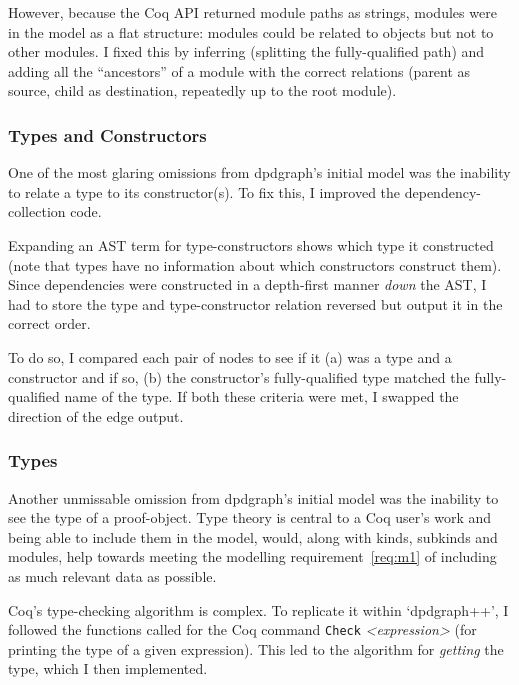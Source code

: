 However, because the Coq API returned module paths as strings, modules were in
the model as a flat structure: modules could be related to objects but not to
other modules. I fixed this by inferring (splitting the fully-qualified path)
and adding all the ``ancestors'' of a module with the correct relations
(parent as source, child as destination, repeatedly up to the root module).

\subsubsection{Types and Constructors}\label{subsubsec:typecon}

One of the most glaring omissions from dpdgraph's initial model was the
inability to relate a type to its constructor(s). To fix this,
I improved the dependency-collection code.

Expanding an AST term for type-constructors shows which type it constructed
(note that types have no information about which constructors construct them).
Since dependencies were constructed in a depth-first manner \emph{down} the AST,
I had to store the type and type-constructor relation reversed but output it
in the correct order.

To do so, I compared each pair of nodes to see if it (a) was a type and a
constructor and if so, (b) the constructor's fully-qualified type matched the
fully-qualified name of the type. If both these criteria were met, I swapped the
direction of the edge output.

\subsubsection{Types}


Another unmissable omission from dpdgraph's initial model was the inability to
see the type of a proof-object. Type theory is central to a Coq user's work and
being able to include them in the model, would, along with kinds, subkinds and
modules, help towards meeting the modelling requirement~\ref{req:m1} of
including as much relevant data as possible. 

Coq's type-checking algorithm is complex. To replicate it within
`dpdgraph++', I followed the functions called for the Coq command
\texttt{Check} \emph{<expression>} (for printing the type of a given
expression).  This led to the algorithm for \emph{getting} the type, which I
then implemented.

